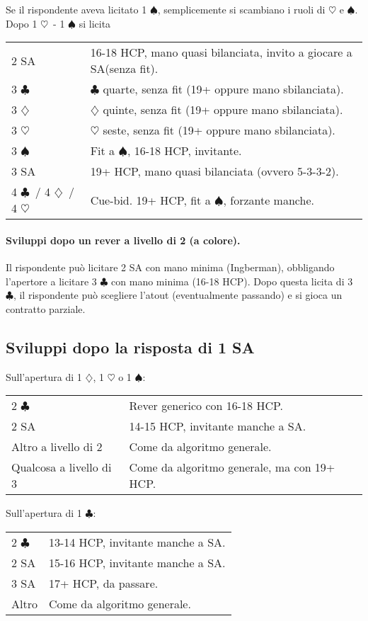 \documentclass[a4paper,10pt]{article}
\renewcommand{\c}{$\clubsuit$\xspace}
\renewcommand{\d}{$\diamondsuit$\xspace}
\newcommand{\h}{$\heartsuit$\xspace}
\newcommand{\s}{$\spadesuit$\xspace}
\newcommand{\sa}{SA\xspace}
\newcommand{\smallspace}{\vskip0.3cm}
\newenvironment{twocol}
  {\smallspace\noindent\begin{tabular}{l p{0.78\textwidth}}}
  {\end{tabular}\smallspace}
\begin{document}
\noindent Se il rispondente aveva licitato 1 \s, semplicemente si scambiano i ruoli di \h e \s.
\smallspace
\noindent Dopo 1 \h\ - 1 \s si licita
\begin{twocol}
 2 \sa & 16-18 HCP, mano quasi bilanciata, invito a giocare a \sa (senza fit).\\
 3 \c & \c quarte, senza fit (19+ oppure mano sbilanciata).\\
 3 \d & \d quinte, senza fit (19+ oppure mano sbilanciata).\\
 3 \h & \h seste, senza fit (19+ oppure mano sbilanciata).\\
 3 \s & Fit a \s, 16-18 HCP, invitante.\\
 3 \sa & 19+ HCP, mano quasi bilanciata (ovvero 5-3-3-2).\\
 4 \c\ / 4 \d\ / 4 \h & Cue-bid. 19+ HCP, fit a \s, forzante manche.\\
\end{twocol}

\paragraph{Sviluppi dopo un rever a livello di 2 (a colore).} Il rispondente può licitare 2 \sa con mano minima (Ingberman), obbligando l'apertore a licitare 3 \c con mano minima (16-18 HCP). Dopo questa licita di 3 \c, il rispondente può scegliere l'atout (eventualmente passando) e si gioca un contratto parziale.



\subsection{Sviluppi dopo la risposta di 1 \sa}

Sull'apertura di 1 \d, 1 \h o 1 \s:
\begin{twocol}
 2 \c & Rever generico con 16-18 HCP.\\
 2 \sa & 14-15 HCP, invitante manche a \sa.\\
 Altro a livello di 2 & Come da algoritmo generale.\\
 Qualcosa a livello di 3 & Come da algoritmo generale, ma con 19+ HCP.
\end{twocol}

\noindent Sull'apertura di 1 \c:
\begin{twocol}
  2 \c & 13-14 HCP, invitante manche a \sa.\\
  2 \sa & 15-16 HCP, invitante manche a \sa.\\
  3 \sa & 17+ HCP, da passare.\\
  Altro & Come da algoritmo generale.
\end{twocol}
\end{document}

